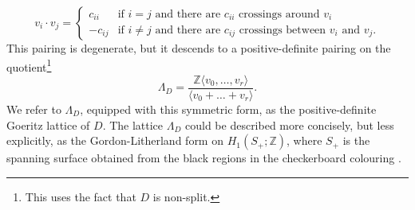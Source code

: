 \documentclass[a4paper,11pt]{amsart}
\theoremstyle{definition}
\theoremstyle{remark}
\numberwithin{equation}{section}
\newcommand{\Z}{\mathbb{Z}}
\begin{document}
 \[
 v_i \cdot v_j=\begin{cases}
        c_{ii}& \text{if $i= j$ and there are $c_{ii}$ crossings around $v_i$}\\
     -c_{ij} &\text{if $i\neq j$ and there are $c_{ij}$ crossings between $v_i$ and $v_j$}.
 \end{cases}
 \]
 This pairing is degenerate, but it descends to a positive-definite pairing on the quotient\footnote{This uses the fact that $D$ is non-split.}
\[
\Lambda_D=\frac{\Z\langle v_0, \dots, v_r \rangle}{\langle v_0+\dots + v_r\rangle}.
\]
We refer to $\Lambda_D$, equipped with this symmetric form, as the positive-definite Goeritz lattice of $D$. The lattice $\Lambda_D$ could be described more concisely, but less explicitly, as the Gordon-Litherland form on $H_1(S_+;\Z)$, where $S_+$ is the spanning surface obtained from the black regions in the checkerboard colouring \cite{GordonLitherland}. 
\end{document}

